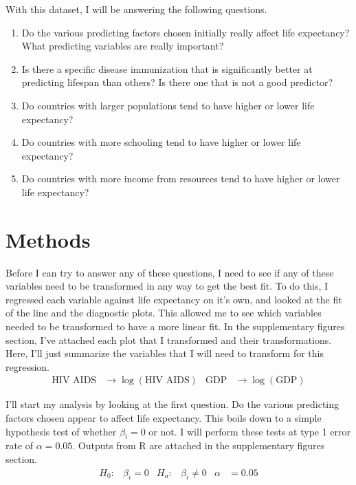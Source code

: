 \documentclass{article}
\renewcommand{\l}{\left}
\renewcommand{\r}{\right}
\begin{document}
 With this dataset, I will be answering the following questions.
	\begin{enumerate}
		\item Do the various predicting factors chosen initially really affect life expectancy? What predicting variables are really important?
		\item Is there a specific disease immunization that is significantly better at predicting lifespan than others? Is there one that is not a good predictor?
		\item Do countries with larger populations tend to have higher or lower life expectancy?
		\item Do countries with more schooling tend to have higher or lower life expectancy?
		\item Do countries with more income from resources tend to have higher or lower life expectancy?
	\end{enumerate}

\section*{Methods}
	Before I can try to answer any of these questions, I need to see if any of these variables need to be transformed in any way to get the best fit. To do this, I regressed each variable against life expectancy on it's own, and looked at the fit of the line and the diagnostic plots. This allowed me to see which variables needed to be transformed to have a more linear fit. In the supplementary figures section, I've attached each plot that I transformed and their transformations. Here, I'll just summarize the variables that I will need to transform for this regression.
	\begin{align*}
		\text{HIV AIDS} &\longrightarrow \log\l(\text{HIV AIDS}\r) & \text{GDP} &\longrightarrow \log\l(\text{GDP}\r)
	\end{align*}

	I'll start my analysis by looking at the first question. Do the various predicting factors chosen appear to affect life expectancy. This boils down to a simple hypothesis test of whether $\beta_i = 0$ or not. I will perform these tests at type 1 error rate of $\alpha = 0.05$. Outputs from R are attached in the supplementary figures section.
	\begin{align*}
		H_0\colon& \beta_i = 0 & H_a\colon& \beta_i \neq 0 & \alpha &= 0.05
	\end{align*}
	
\end{document}
